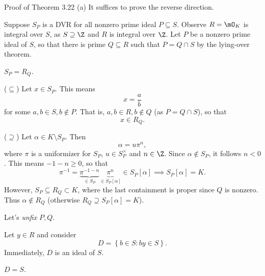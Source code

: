 \documentclass[pmath441]{subfiles}
\begin{document}
    \begin{boxyproof}{Proof of Theorem 3.22 (a)}
        It suffices to prove the reverse direction.

        Suppose $S_P$ is a DVR for all nonzero prime ideal $P\subseteq S$. Observe $R=\mO_K$ is integral over $S$, as $S\supseteq\Z$ and $R$ is integral over $\Z$. Let $P$ be a nonzero prime ideal of $S$, so that there is prime $Q\subseteq R$ such that $P=Q\cap S$ by the lying-over theorem.

        \begin{claim}
            \textit{$S_P = R_Q$.}

            ($\subseteq$) Let $x\in S_P$. This means
            \begin{equation*}
                x = \frac{a}{b}
            \end{equation*}
            for some $a,b\in S, b\notin P$. That is, $a,b\in R, b\notin Q$ (as $P=Q\cap S$), so that
            \begin{equation*}
                x\in R_Q.
            \end{equation*}

            ($\supseteq$) Let $\alpha\in K\setminus S_P$. Then
            \begin{equation*}
                \alpha = u\pi^n,
            \end{equation*}
            where $\pi$ is a uniformizer for $S_P$, $u\in S_P^{\times}$ and $n\in\Z$. Since $\alpha\notin S_P$, it follows $n<0$. This means $-1-n\geq 0$, so that
            \begin{equation*}
                \pi^{-1} = \underbrace{\pi^{-1-n}}_{\in S_P}\underbrace{\pi^n}_{\in S_P\left[ \alpha \right]} \in S_P\left[ \alpha \right] \implies S_P\left[ \alpha \right] = K.
            \end{equation*}
            However, $S_P\subseteq R_Q\subset K$, where the last containment is proper since $Q$ is nonzero. Thus $\alpha\notin R_Q$ (otherwise $R_Q\supseteq S_P\left[ \alpha \right] = K$). 
        \end{claim}

        Let's \textit{unfix} $P,Q$.

        Let $y\in R$ and consider
        \begin{equation*}
            D = \left\lbrace b\in S: by\in S \right\rbrace.
        \end{equation*}
        Immediately, $D$ is an ideal of $S$.

        \begin{claim}
            \textit{$D=S$.}


\end{claim}
\end{boxyproof}
\end{document}

